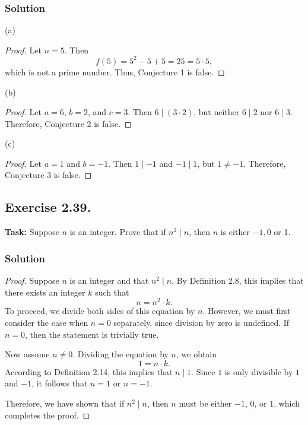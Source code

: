 \documentclass{article}
\begin{document}
\subsubsection*{Solution}

(a)

\begin{proof}
     Let $n = 5$. Then 
    \[
    f(5) = 5^2 - 5 + 5 = 25 = 5 \cdot 5,
    \]
    which is not a prime number. Thus, Conjecture 1 is false.
\end{proof}

\noindent (b)

\begin{proof}
     Let $a = 6$, $b = 2$, and $c = 3$. Then $6 \mid (3 \cdot 2)$, but neither $6 \mid 2$ nor $6 \mid 3$. Therefore, Conjecture 2 is false.
\end{proof}

\noindent (c)

\begin{proof}
    Let $a = 1$ and $b = -1$. Then $1 \mid -1$ and $-1 \mid 1$, but $1 \neq -1$. Therefore, Conjecture 3 is false.
\end{proof}

\subsection{Exercise 2.39.}
\textbf{Task:} Suppose $n$ is an integer. Prove that if $n^2 \mid n$, then $n$ is either $-1,0$ or 1. 

\subsubsection*{Solution}

\begin{proof}
    Suppose $n$ is an integer and that $n^2 \mid n$. By Definition 2.8, this implies that there exists an integer $k$ such that
    \[
    n = n^2 \cdot k.
    \]
    To proceed, we divide both sides of this equation by $n$. However, we must first consider the case when $n = 0$ separately, since division by zero is undefined. If $n = 0$, then the statement is trivially true. 

    Now assume $n \neq 0$. Dividing the equation by $n$, we obtain
    \[
    1 = n \cdot k.
    \]
    According to Definition 2.14, this implies that $n \mid 1$. Since $1$ is only divisible by $1$ and $-1$, it follows that $n = 1$ or $n = -1$.

    Therefore, we have shown that if $n^2 \mid n$, then $n$ must be either $-1$, $0$, or $1$, which completes the proof.
\end{proof}
\end{document}
